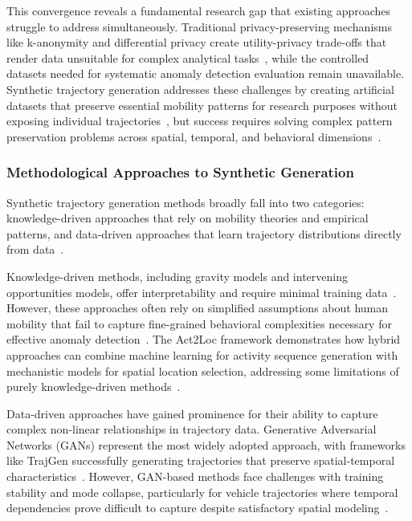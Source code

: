 \documentclass[runningheads]{llncs}
\begin{document}
This convergence reveals a fundamental research gap that existing approaches struggle to address simultaneously. Traditional privacy-preserving mechanisms like k-anonymity and differential privacy create utility-privacy trade-offs that render data unsuitable for complex analytical tasks~\cite{jordon2019pate}, while the controlled datasets needed for systematic anomaly detection evaluation remain unavailable. Synthetic trajectory generation addresses these challenges by creating artificial datasets that preserve essential mobility patterns for research purposes without exposing individual trajectories~\cite{cao2021generating}, but success requires solving complex pattern preservation problems across spatial, temporal, and behavioral dimensions~\cite{kong2023mobility,merhi2024synthetic}.

\subsubsection{Methodological Approaches to Synthetic Generation}

Synthetic trajectory generation methods broadly fall into two categories: knowledge-driven approaches that rely on mobility theories and empirical patterns, and data-driven approaches that learn trajectory distributions directly from data~\cite{kong2023mobility,wang2025gtg}.

Knowledge-driven methods, including gravity models and intervening opportunities models, offer interpretability and require minimal training data~\cite{liu2023act2loc}. However, these approaches often rely on simplified assumptions about human mobility that fail to capture fine-grained behavioral complexities necessary for effective anomaly detection~\cite{kong2023mobility}. The Act2Loc framework demonstrates how hybrid approaches can combine machine learning for activity sequence generation with mechanistic models for spatial location selection, addressing some limitations of purely knowledge-driven methods~\cite{liu2023act2loc}.

Data-driven approaches have gained prominence for their ability to capture complex non-linear relationships in trajectory data. Generative Adversarial Networks (GANs) represent the most widely adopted approach, with frameworks like TrajGen successfully generating trajectories that preserve spatial-temporal characteristics~\cite{cao2021generating}. However, GAN-based methods face challenges with training stability and mode collapse, particularly for vehicle trajectories where temporal dependencies prove difficult to capture despite satisfactory spatial modeling~\cite{bajarunas2022generative}.
\end{document}
